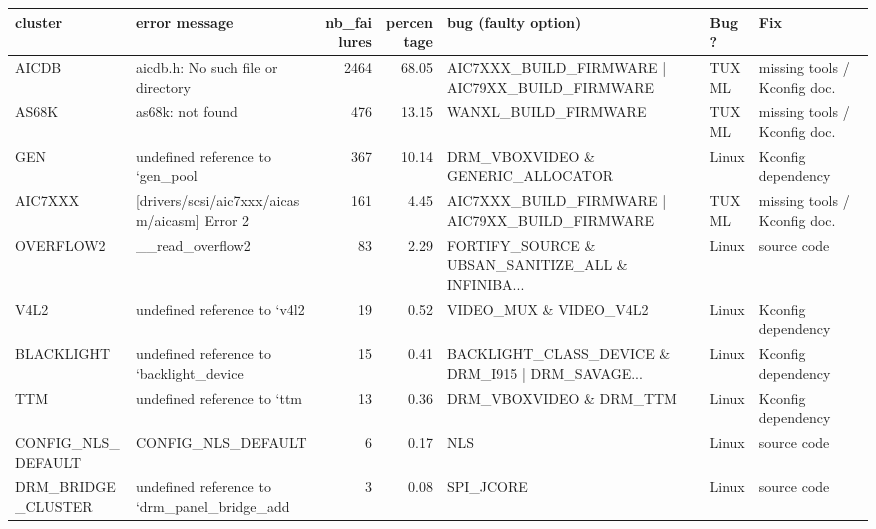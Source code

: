 \begin{tabular}{llrrlll}
\toprule
            cluster &                                      error message &  nb\_failures &  percentage &                                bug (faulty option) &   Bug? &                               Fix \\
\midrule
              AICDB &                 aicdb.h: No such file or directory &         2464 &       68.05 &    AIC7XXX\_BUILD\_FIRMWARE | AIC79XX\_BUILD\_FIRMWARE &  TUXML &      missing tools / Kconfig doc. \\
              AS68K &                                   as68k: not found &          476 &       13.15 &                               WANXL\_BUILD\_FIRMWARE &  TUXML &      missing tools / Kconfig doc. \\
                GEN &                   undefined reference to `gen\_pool &          367 &       10.14 &                  DRM\_VBOXVIDEO \& GENERIC\_ALLOCATOR &  Linux &                Kconfig dependency \\
            AIC7XXX &       [drivers/scsi/aic7xxx/aicasm/aicasm] Error 2 &          161 &        4.45 &    AIC7XXX\_BUILD\_FIRMWARE | AIC79XX\_BUILD\_FIRMWARE &  TUXML &      missing tools / Kconfig doc. \\
          OVERFLOW2 &                                   \_\_read\_overflow2 &           83 &        2.29 &  FORTIFY\_SOURCE \& UBSAN\_SANITIZE\_ALL \& INFINIBA... &  Linux &                       source code \\
               V4L2 &                       undefined reference to `v4l2 &           19 &        0.52 &                            VIDEO\_MUX \& VIDEO\_V4L2  &  Linux &                Kconfig dependency \\
         BLACKLIGHT &           undefined reference to `backlight\_device &           15 &        0.41 &  BACKLIGHT\_CLASS\_DEVICE \& DRM\_I915 | DRM\_SAVAGE... &  Linux &                Kconfig dependency \\
                TTM &                        undefined reference to `ttm &           13 &        0.36 &                            DRM\_VBOXVIDEO \& DRM\_TTM &  Linux &                Kconfig dependency \\
 CONFIG\_NLS\_DEFAULT &                                 CONFIG\_NLS\_DEFAULT &            6 &        0.17 &                                                NLS &  Linux &                       source code \\
 DRM\_BRIDGE\_CLUSTER &       undefined reference to `drm\_panel\_bridge\_add &            3 &        0.08 &                                          SPI\_JCORE &  Linux &                      source code  \\

\end{tabular}

